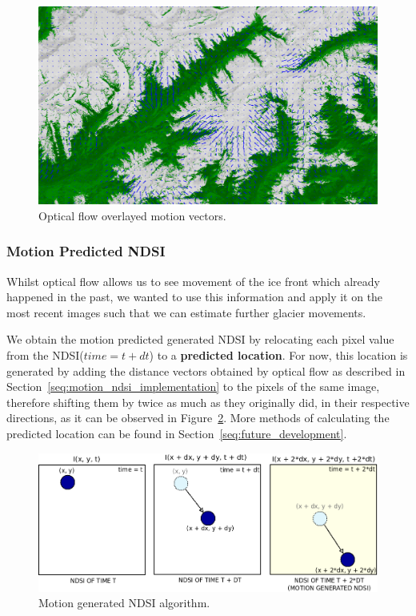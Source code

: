 \documentclass[12pt, a4paper]{report}
\begin{document}
	\begin{figure}[h!]
		\centering
		\includegraphics[scale=0.32]{../images/LC81940282015363LGN02_NDSI_vectros_small.png}
		\caption{Optical flow overlayed motion vectors.}
		\label{fig:optical_flow}
	\end{figure}

	\subsubsection{Motion Predicted NDSI}
	\label{seq:motion_ndsi_functional}
	
	\par Whilst optical flow allows us to see movement of the ice front which already happened in the past, we wanted to use this information and apply it on the most recent images such that we can estimate further glacier movements.

	\par We obtain the motion predicted generated NDSI by relocating each pixel value from the NDSI(\(time=t + dt\)) to a \textbf{predicted location}. For now, this location is generated by adding the distance vectors obtained by optical flow as described in Section~\ref{seq:motion_ndsi_implementation} to the pixels of the same image, therefore shifting them by twice as much as they originally did, in their respective directions, as it can be observed in Figure~\ref{fig:motion_generated_schema}. More methods of calculating the predicted location can be found in Section~\ref{seq:future_development}.
	
	\begin{figure}[h!]
		\centering
		\includegraphics[scale=0.5]{../images/motion_generated_schema.png}
		\caption{Motion generated NDSI algorithm.}
		\label{fig:motion_generated_schema}
	\end{figure}
\end{document}
